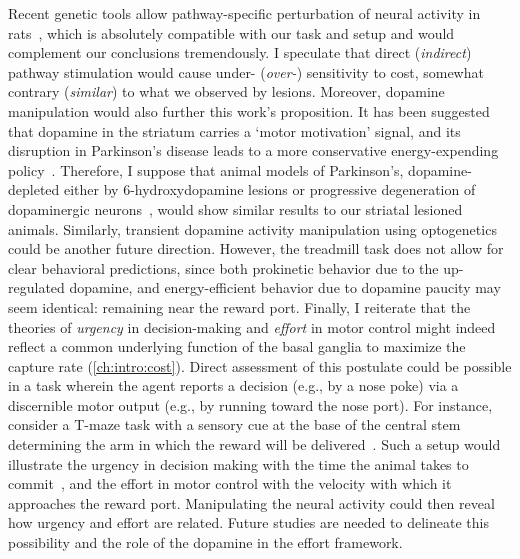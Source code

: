 Recent genetic tools allow pathway-specific perturbation of neural activity in rats~\cite{Pettibone2019eNeuro}, which is absolutely compatible with our task and setup and would complement our conclusions tremendously.
I speculate that direct (\textit{indirect}) pathway stimulation would cause under- (\textit{over-}) sensitivity to cost, somewhat contrary (\textit{similar}) to what we observed by lesions.
Moreover, dopamine manipulation would also further this work's proposition.
It has been suggested that dopamine in the striatum carries a `motor motivation' signal, and its disruption in Parkinson's disease leads to a more conservative energy-expending policy~\cite{Mazzoni2007}.
Therefore, I suppose that animal models of Parkinson's, dopamine-depleted either by 6-hydroxydopamine lesions or progressive degeneration of dopaminergic neurons~\cite{Panigrahi2015Cell}, would show similar results to our striatal lesioned animals.
Similarly, transient dopamine activity manipulation using optogenetics could be another future direction.
However, the treadmill task does not allow for clear behavioral predictions, since both prokinetic behavior due to the up-regulated dopamine, and energy-efficient behavior due to dopamine paucity may seem identical:
remaining near the reward port.
Finally, I reiterate that the theories of \textit{urgency} in decision-making and \textit{effort} in motor control might indeed reflect a common underlying function of the basal ganglia to maximize the capture rate (\autoref{ch:intro:cost}).
Direct assessment of this postulate could be possible in a task wherein the agent reports a decision (e.g., by a nose poke) via a discernible motor output (e.g., by running toward the nose port).
For instance, consider a T-maze task with a sensory cue at the base of the central stem determining the arm in which the reward will be delivered~\cite[i.e., a combination of][]{Zuo2019CurrBiol,Barnes2005Nature}.
Such a setup would illustrate the urgency in decision making with the time the animal takes to commit~\cite{Thura2017Neruon}, and the effort in motor control with the velocity with which it approaches the reward port.
Manipulating the neural activity could then reveal how urgency and effort are related.
Future studies are needed to delineate this possibility and the role of the dopamine in the effort framework.